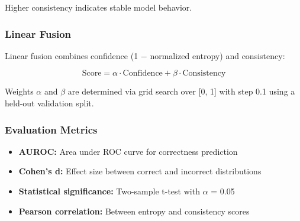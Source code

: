 Higher consistency indicates stable model behavior.

\subsubsection{Linear Fusion}

Linear fusion combines confidence (1 $-$ normalized entropy) and consistency:

$$\text{Score} = \alpha \cdot \text{Confidence} + \beta \cdot \text{Consistency}$$

Weights $\alpha$ and $\beta$ are determined via grid search over [0, 1] with step 0.1 using a held-out validation split.

\subsubsection{Evaluation Metrics}

\begin{itemize}
\item \textbf{AUROC:} Area under ROC curve for correctness prediction
\item \textbf{Cohen's d:} Effect size between correct and incorrect distributions
\item \textbf{Statistical significance:} Two-sample t-test with $\alpha$ = 0.05
\item \textbf{Pearson correlation:} Between entropy and consistency scores
\end{itemize}

